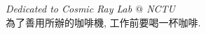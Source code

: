 \begin{dedication}%

\textit{Dedicated to Cosmic Ray Lab $@$ NCTU}\\

{\Large 為了善用所辦的咖啡機, 工作前要喝一杯咖啡.}\\

\end{dedication}